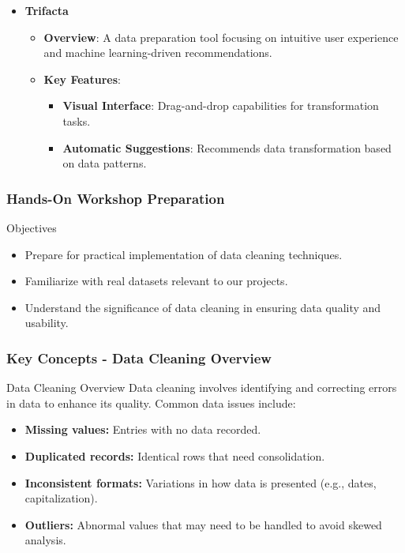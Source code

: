 \documentclass[aspectratio=169]{beamer}
\begin{document}
\begin{frame}[fragile]
\begin{itemize}
        \item \textbf{Trifacta}
        \begin{itemize}
            \item \textbf{Overview}: A data preparation tool focusing on intuitive user experience and machine learning-driven recommendations.
            \item \textbf{Key Features}:
            \begin{itemize}
                \item \textbf{Visual Interface}: Drag-and-drop capabilities for transformation tasks.
                \item \textbf{Automatic Suggestions}: Recommends data transformation based on data patterns.
            \end{itemize}
        \end{itemize}
    \end{itemize}
\end{frame}

\begin{frame}[fragile]
    \frametitle{Hands-On Workshop Preparation}
    \begin{block}{Objectives}
        \begin{itemize}
            \item Prepare for practical implementation of data cleaning techniques.
            \item Familiarize with real datasets relevant to our projects.
            \item Understand the significance of data cleaning in ensuring data quality and usability.
        \end{itemize}
    \end{block}
\end{frame}

\begin{frame}[fragile]
    \frametitle{Key Concepts - Data Cleaning Overview}
    \begin{block}{Data Cleaning Overview}
        Data cleaning involves identifying and correcting errors in data to enhance its quality. Common data issues include:
    \end{block}
    \begin{itemize}
        \item \textbf{Missing values:} Entries with no data recorded.
        \item \textbf{Duplicated records:} Identical rows that need consolidation.
        \item \textbf{Inconsistent formats:} Variations in how data is presented (e.g., dates, capitalization).
        \item \textbf{Outliers:} Abnormal values that may need to be handled to avoid skewed analysis.
    \end{itemize}
\end{frame}
\end{document}
